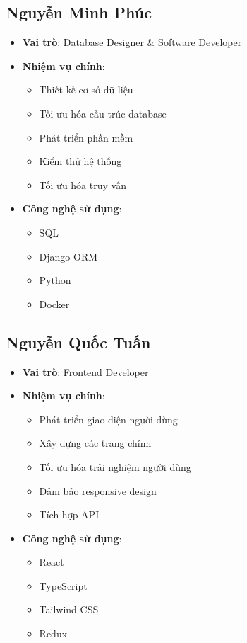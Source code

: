 \documentclass{book}
\begin{document}
\subsection{Nguyễn Minh Phúc}
\begin{itemize}
    \item \textbf{Vai trò}: Database Designer \& Software Developer
    \item \textbf{Nhiệm vụ chính}:
    \begin{itemize}
        \item Thiết kế cơ sở dữ liệu
        \item Tối ưu hóa cấu trúc database
        \item Phát triển phần mềm
        \item Kiểm thử hệ thống
        \item Tối ưu hóa truy vấn
    \end{itemize}
    \item \textbf{Công nghệ sử dụng}:
    \begin{itemize}
        \item SQL
        \item Django ORM
        \item Python
        \item Docker
    \end{itemize}
\end{itemize}

\subsection{Nguyễn Quốc Tuấn}
\begin{itemize}
    \item \textbf{Vai trò}: Frontend Developer
    \item \textbf{Nhiệm vụ chính}:
    \begin{itemize}
        \item Phát triển giao diện người dùng
        \item Xây dựng các trang chính
        \item Tối ưu hóa trải nghiệm người dùng
        \item Đảm bảo responsive design
        \item Tích hợp API
    \end{itemize}
    \item \textbf{Công nghệ sử dụng}:
    \begin{itemize}
        \item React
        \item TypeScript
        \item Tailwind CSS
        \item Redux
    \end{itemize}
\end{itemize}
\end{document}
